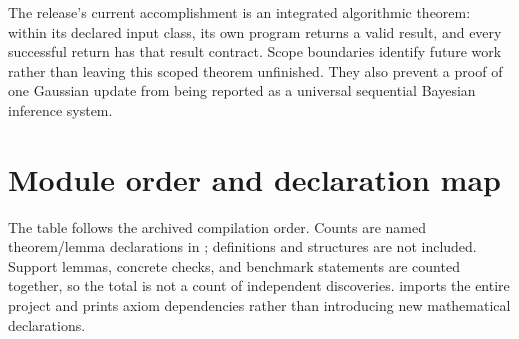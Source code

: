 \documentclass[11pt]{article}\usepackage{needspace}\renewcommand{\paperkind}{Lean companion}\setlength{\parskip}{0.35em}
\begin{document}
The release's current accomplishment is an integrated algorithmic theorem: within its declared input class, its own program returns a valid result, and every successful return has that result contract. Scope boundaries identify future work rather than leaving this scoped theorem unfinished. They also prevent a proof of one Gaussian update from being reported as a universal sequential Bayesian inference system.

\appendix\clearpage\section{Module order and declaration map}

The table follows the archived compilation order. Counts are named theorem/lemma declarations in ; definitions and structures are not included. Support lemmas, concrete checks, and benchmark statements are counted together, so the total is not a count of independent discoveries.  imports the entire project and prints axiom dependencies rather than introducing new mathematical declarations.
\end{document}
